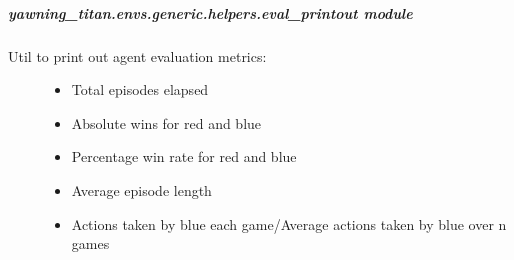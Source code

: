 \documentclass[letterpaper,10pt,english]{sphinxmanual}
\begin{document}
\subparagraph{yawning\_titan.envs.generic.helpers.eval\_printout module}
\label{\detokenize{source/yawning_titan.envs.generic.helpers:module-yawning_titan.envs.generic.helpers.eval_printout}}\label{\detokenize{source/yawning_titan.envs.generic.helpers:yawning-titan-envs-generic-helpers-eval-printout-module}}\begin{description}
\item[{Util to print out agent evaluation metrics:}] \leavevmode\begin{itemize}
\item {}
\sphinxAtStartPar
Total episodes elapsed

\item {}
\sphinxAtStartPar
Absolute wins for red and blue

\item {}
\sphinxAtStartPar
Percentage win rate for red and blue

\item {}
\sphinxAtStartPar
Average episode length

\item {}
\sphinxAtStartPar
Actions taken by blue each game/Average actions taken by blue over n games

\end{itemize}

\end{description}
\end{document}

